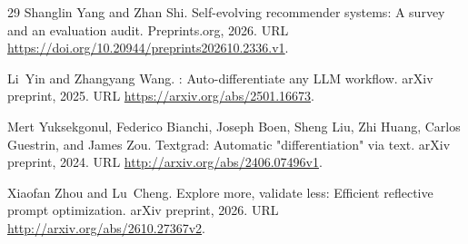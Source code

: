 \documentclass[10pt]{article}
\begin{document}
\begin{thebibliography}{29}
Shanglin Yang and Zhan Shi.
\newblock Self-evolving recommender systems: A survey and an evaluation audit.
\newblock Preprints.org, 2026.
\newblock URL \url{https://doi.org/10.20944/preprints202610.2336.v1}.

Li~Yin and Zhangyang Wang.
: Auto-differentiate any {LLM} workflow.
\newblock arXiv preprint, 2025.
\newblock URL \url{https://arxiv.org/abs/2501.16673}.

Mert Yuksekgonul, Federico Bianchi, Joseph Boen, Sheng Liu, Zhi Huang, Carlos
  Guestrin, and James Zou.
\newblock Textgrad: Automatic "differentiation" via text.
\newblock arXiv preprint, 2024.
\newblock URL \url{http://arxiv.org/abs/2406.07496v1}.

Xiaofan Zhou and Lu~Cheng.
\newblock Explore more, validate less: Efficient reflective prompt
  optimization.
\newblock arXiv preprint, 2026.
\newblock URL \url{http://arxiv.org/abs/2610.27367v2}.

\end{thebibliography}
\end{document}
